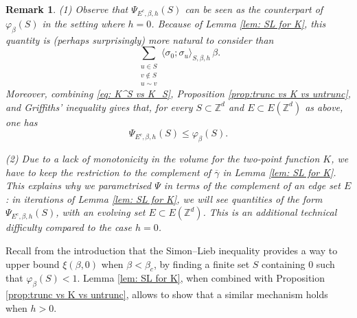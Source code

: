 \documentclass[10pt,a4paper]{amsart}
\numberwithin{equation}{section}
\newtheorem{Rem}[Thm]{Remark}
\begin{document}
\begin{Rem}\label{rem:comp psi phi}
(1) Observe that $\Psi_{E^c,\beta,h}(S)$ can be seen as the counterpart of $\varphi_\beta(S)$ in the setting where $h=0$. Because of Lemma \ref{lem: SL for K}, this quantity is (perhaps surprisingly) more natural to consider than 
\begin{equation}
	\sum_{\substack{u\in S\\v\notin S\\u \sim v}}\langle \sigma_0;\sigma_u\rangle_{S,\beta,h}\, \beta.
\end{equation}
Moreover, combining \eqref{eq: K^S vs K_S}, Proposition \ref{prop:trunc vs K vs untrunc}, and Griffiths' inequality gives that, for every $S\subset \mathbb Z^d$ and $E\subset E(\mathbb Z^d)$ as above, one has
\begin{equation}\label{eq:BOUND PSI BY PHI}
	\Psi_{E^c,\beta,h}(S)\leq \varphi_\beta(S).
\end{equation}
%
%


(2) Due to a lack of monotonicity in the volume for the two-point function $K$, we have to keep the restriction to the complement of $\overline{\gamma}$ in Lemma \ref{lem: SL for K}. This explains why we parametrised $\Psi$ in terms of the complement of an edge set $E$: in iterations of Lemma \ref{lem: SL for K}, we will see quantities of the form $\Psi_{E^c,\beta,h}(S)$, with an \emph{evolving} set $E\subset E(\mathbb Z^d)$. This is an additional technical difficulty compared to the case $h=0$.
\end{Rem}

Recall from the introduction that the Simon--Lieb inequality provides a way to upper bound $\xi(\beta,0)$ when $\beta<\beta_c$, by finding a finite set $S$ containing $0$ such that $\varphi_\beta(S)<1$. Lemma \ref{lem: SL for K}, when combined with Proposition \ref{prop:trunc vs K vs untrunc}, allows to show that a similar mechanism holds when $h>0$.
\end{document}
